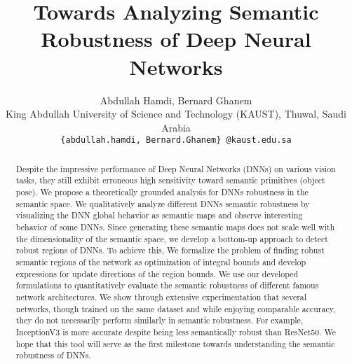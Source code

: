 \documentclass[10pt,twocolumn,letterpaper]{article}
\begin{document}
\title{Towards Analyzing Semantic Robustness of Deep Neural Networks}

\author{Abdullah Hamdi, Bernard Ghanem\\
King Abdullah University of Science and Technology (KAUST), Thuwal, Saudi Arabia\\
{\tt\small \{abdullah.hamdi, Bernard.Ghanem\} @kaust.edu.sa}
}

\maketitle


\begin{abstract}
Despite the impressive performance of Deep Neural Networks (DNNs) on various vision tasks, they still exhibit erroneous high sensitivity toward semantic primitives (\eg object pose). We propose a theoretically grounded analysis for DNNs robustness in the semantic space. We qualitatively analyze different DNNs semantic robustness by visualizing the DNN global behavior as semantic maps and observe interesting behavior of some DNNs. Since generating these semantic maps does not scale well with the dimensionality of the semantic space, we develop a bottom-up approach to detect robust regions of DNNs. To achieve this, We formalize the problem of finding robust semantic regions of the network as optimization of integral bounds and develop expressions for update directions of the region bounds. We use our developed formulations to quantitatively evaluate the semantic robustness of different famous network architectures. We show through extensive experimentation that several networks, though trained on the same dataset and while enjoying comparable accuracy, they do not necessarily perform similarly in semantic robustness. For example, InceptionV3 is more accurate despite being less semantically robust than ResNet50. We hope that this tool will serve as the first milestone towards understanding the semantic robustness of DNNs.
\end{abstract}










{\small


}

\end{document}
